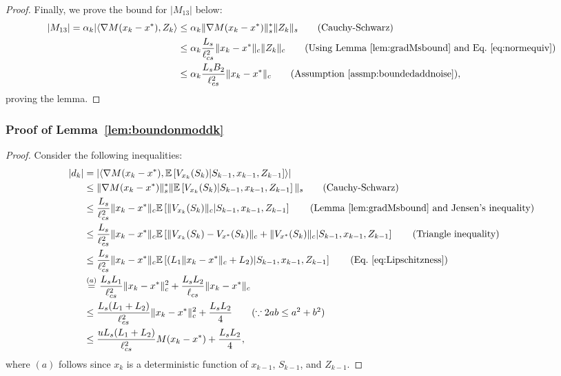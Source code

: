 \documentclass{article}
\newcommand{\lrs}[1]{\left[ #1 \right]}
\newcommand{\abs}[1]{\left|{#1}\right|}
\newcommand{\E}[1]{\mathbb{E}\lrs{#1}}
\newcommand{\lcs}{\ell_{cs}}
\newcommand{\xk}{x_k}
\begin{document}
\begin{proof}
Finally, we prove the bound for $|M_{13}|$ below: 
\begin{align*}
    |M_{13}| = \alpha_k | \langle \nabla M(x_k - x^*), Z_k \rangle &\le \alpha_k \| \nabla M(x_k - x^*) \|^*_s \|Z_k\|_s \tag{Cauchy-Schwarz}\\
    &\le  \alpha_k \frac{L_s}{\lcs^2} \|x_k - x^*\|_c \|Z_k\|_c  \tag{Using Lemma~\ref{lem:gradMsbound} and Eq.~\eqref{eq:normequiv}}\\
    &\le \alpha_k \frac{L_s B_2}{\lcs^2} \|x_k -x^*\|_c \tag{Assumption~\ref{assmp:boundedaddnoise}},
\end{align*}
proving the lemma. 
\end{proof}

\subsubsection{Proof of Lemma~\ref{lem:boundonmoddk}}\label{app:proof_lem:boundonmoddk}

\begin{proof} Consider the following inequalities:
    \begin{align*}
        |d_k| 
        &= \abs{\langle \nabla M(x_k - x^*), \E{V_{x_k}(S_k) | S_{k-1}, x_{k-1}, Z_{k-1}} \rangle}\\
        &\le \| \nabla M(x_k - x^*)\|^*_s \|\E{V_{x_k}(S_k)|S_{k-1}, x_{k-1}, Z_{k-1}}\|_s \tag{Cauchy-Schwarz}\\
        &\le \frac{L_s}{\lcs^2} \|\xk-x^*\|_c \E{\|V_{x_k}(S_k)\|_c | S_{k-1}, x_{k-1}, Z_{k-1} } \tag{Lemma~\ref{lem:gradMsbound} and Jensen's inequality}\\
        &\le \frac{L_s}{\lcs^2} \|x_k-x^*\|_c \E{\|V_{x_k}(S_k)-V_{x^*}(S_k)\|_c + \| V_{x^*}(S_k) \|_c| S_{k-1}, x_{k-1}, Z_{k-1} } \tag{Triangle inequality} \\
        &\le \frac{L_s}{\lcs^2}  \|x_k-x^*\|_c \E{(L_1\|x_k - x^*\|_c + L_2) | S_{k-1}, x_{k-1}, Z_{k-1} } \tag{Eq.~\eqref{eq:Lipschitzness}} \\
        &\overset{(a)}{=} \frac{L_s L_1}{\lcs^2}  \|x_k-x^*\|^2_c + \frac{L_s L_2}{\lcs} \|x_k - x^*\|_c \\
        &\le \frac{L_s(L_1+L_2)}{\lcs^2} \|x_k-x^*\|^2_c + \frac{L_sL_2}{4} \tag{$\because   2ab \le a^2 + b^2$}\\
        &\le \frac{uL_s(L_1+L_2)}{\lcs^2} M(x_k-x^*) + \frac{L_sL_2}{4},
    \end{align*}
where $(a)$ follows since $x_k$ is a deterministic function of $x_{k-1}$, $S_{k-1}$, and $Z_{k-1}$.
\end{proof}
\end{document}
